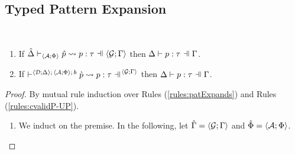 \vspace{15px}
\begin{grayparbox}\vspace{-15px}
\subsection{Typed Pattern Expansion}\label{appendix:SES-typed-pattern-expansion}
\begin{theorem}\label{thm:typed-pattern-expansion} ~
\begin{enumerate}
  \item If $\patExpands{\uGG{\uG}{\pctx}}{\uAP{\uA}{\Phi}}{\upv}{p}{\tau}$ then $\patType{\pctx}{p}{\tau}$.
  \item If $\cvalidP{\uGG{\uG}{\pctx}}{\pscene{\uDD{\uD}{\Delta}}{\uAP{\uA}{\Phi}}{b}}{\cpv}{p}{\tau}$ then $\patType{\pctx}{p}{\tau}$.
\end{enumerate}
\end{theorem}
\begin{proof}
  By mutual rule induction over Rules (\ref{rules:patExpands}) and Rules (\ref{rules:cvalidP-UP}).
  \begin{enumerate}
  \item We induct on the premise. In the following, let $\hat\Gamma=\langle \mathcal{G}; \Gamma \rangle$ and $\hat\Phi=\langle \mathcal{A}; \Phi \rangle$.
\end{enumerate}
\end{proof}
\end{grayparbox}
